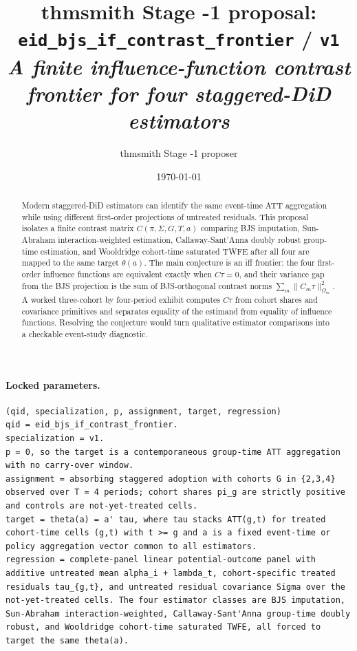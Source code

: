 \documentclass[11pt]{article}
\title{thmsmith Stage -1 proposal: \texttt{eid\_bjs\_if\_contrast\_frontier} / \texttt{v1}%
  \\ \large\textit{A finite influence-function contrast frontier for four staggered-DiD estimators}}
\author{thmsmith Stage -1 proposer}
\date{\today}
\theoremstyle{definition}
\theoremstyle{plain}
\theoremstyle{remark}
\begin{document}
\maketitle


\paragraph{Locked parameters.}
\begin{verbatim}
(qid, specialization, p, assignment, target, regression)
qid = eid_bjs_if_contrast_frontier.
specialization = v1.
p = 0, so the target is a contemporaneous group-time ATT aggregation with no carry-over window.
assignment = absorbing staggered adoption with cohorts G in {2,3,4} observed over T = 4 periods; cohort shares pi_g are strictly positive and controls are not-yet-treated cells.
target = theta(a) = a' tau, where tau stacks ATT(g,t) for treated cohort-time cells (g,t) with t >= g and a is a fixed event-time or policy aggregation vector common to all estimators.
regression = complete-panel linear potential-outcome panel with additive untreated mean alpha_i + lambda_t, cohort-specific treated residuals tau_{g,t}, and untreated residual covariance Sigma over the not-yet-treated cells. The four estimator classes are BJS imputation, Sun-Abraham interaction-weighted, Callaway-Sant'Anna group-time doubly robust, and Wooldridge cohort-time saturated TWFE, all forced to target the same theta(a).
\end{verbatim}

\begin{abstract}
Modern staggered-DiD estimators can identify the same event-time ATT aggregation while using different first-order projections of untreated residuals. This proposal isolates a finite contrast matrix \(C(\pi,\Sigma,G,T,a)\) comparing BJS imputation, Sun-Abraham interaction-weighted estimation, Callaway-Sant'Anna doubly robust group-time estimation, and Wooldridge cohort-time saturated TWFE after all four are mapped to the same target \(\theta(a)\). The main conjecture is an iff frontier: the four first-order influence functions are equivalent exactly when \(C\tau=0\), and their variance gap from the BJS projection is the sum of BJS-orthogonal contrast norms \(\sum_m\|C_m\tau\|_{\Omega_m}^{2}\). A worked three-cohort by four-period exhibit computes \(C\tau\) from cohort shares and covariance primitives and separates equality of the estimand from equality of influence functions. Resolving the conjecture would turn qualitative estimator comparisons into a checkable event-study diagnostic.
\end{abstract}
\end{document}
